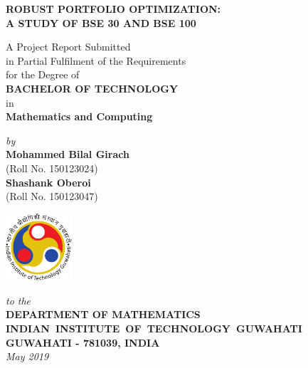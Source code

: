 \documentclass[12pt,a4paper]{report}
\theoremstyle{plain}
\theoremstyle{definition}
\theoremstyle{remark}
\begin{document}


\begin{titlepage}
\enlargethispage{3cm}

\begin{center}

\vspace*{-2cm}

\textbf{\Large ROBUST PORTFOLIO OPTIMIZATION:\\
A STUDY OF BSE 30 AND BSE 100}

\vfill

 A Project Report Submitted \\
 in Partial Fulfilment of the Requirements  \\
  for the Degree of  \\[10pt]

 {\Large \bf BACHELOR OF TECHNOLOGY}\\[5pt]
 in \\
 {\large \bf Mathematics and Computing}

 \vfill

{\large \emph{by}}\\[5pt]
{\large\bf {Mohammed Bilal Girach}}\\[5pt]
{\large (Roll No. 150123024)} \\ [5pt]
{\large\bf {Shashank Oberoi}}\\[5pt]
{\large (Roll No. 150123047)}

\vfill
\includegraphics[height=2.5cm]{iitglogo}

\vspace*{0.5cm}

{\em\large to the}\\[10pt]
{\bf\large DEPARTMENT OF MATHEMATICS} \\[5pt]
{\bf\large \mbox{INDIAN INSTITUTE OF TECHNOLOGY GUWAHATI}}\\[5pt]
{\bf\large GUWAHATI - 781039, INDIA}\\[10pt]
{\it\large May 2019}
\end{center}

\end{titlepage}
\end{document}
